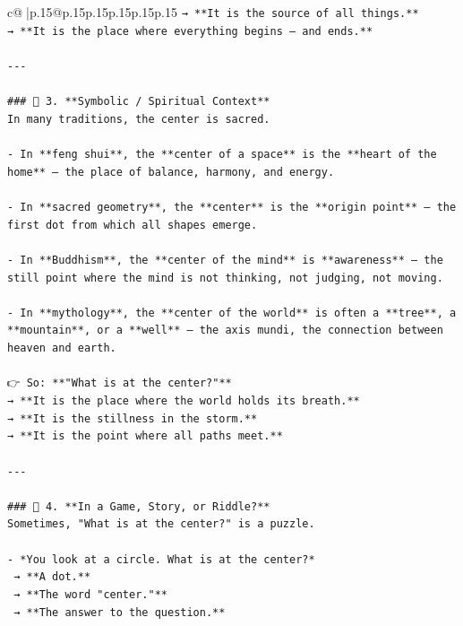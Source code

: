 \documentclass{article}
\begin{document}
{\begin{supertabular}{c@{$\;$}|p{.15\linewidth}@{}p{.15\linewidth}p{.15\linewidth}p{.15\linewidth}p{.15\linewidth}p{.15\linewidth}}
{{{\texttt{→ **It is the source of all things.**  } \\
\texttt{→ **It is the place where everything begins — and ends.**} \\
\\ 
\texttt{{-}{-}{-}} \\
\\ 
\texttt{\#\#\# 🔹 3. **Symbolic / Spiritual Context**  } \\
\texttt{In many traditions, the center is sacred.} \\
\\ 
\texttt{{-} In **feng shui**, the **center of a space** is the **heart of the home** — the place of balance, harmony, and energy.} \\
\\ 
\texttt{{-} In **sacred geometry**, the **center** is the **origin point** — the first dot from which all shapes emerge.} \\
\\ 
\texttt{{-} In **Buddhism**, the **center of the mind** is **awareness** — the still point where the mind is not thinking, not judging, not moving.} \\
\\ 
\texttt{{-} In **mythology**, the **center of the world** is often a **tree**, a **mountain**, or a **well** — the axis mundi, the connection between heaven and earth.} \\
\\ 
\texttt{👉 So: **"What is at the center?"**  } \\
\texttt{→ **It is the place where the world holds its breath.**  } \\
\texttt{→ **It is the stillness in the storm.**  } \\
\texttt{→ **It is the point where all paths meet.**} \\
\\ 
\texttt{{-}{-}{-}} \\
\\ 
\texttt{\#\#\# 🔹 4. **In a Game, Story, or Riddle?**  } \\
\texttt{Sometimes, "What is at the center?" is a puzzle.} \\
\\ 
\texttt{{-} *You look at a circle. What is at the center?*  } \\
\texttt{  → **A dot.**  } \\
\texttt{  → **The word "center."**  } \\
\texttt{  → **The answer to the question.**} \\
}}}
\end{supertabular}}
\end{document}
